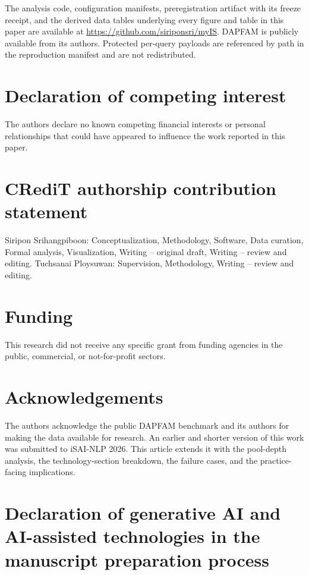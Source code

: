 \documentclass[preprint,11pt,authoryear]{elsarticle}          %
\begin{document}
The analysis code, configuration manifests, preregistration artifact with its freeze receipt, and the derived data tables underlying every figure and table in this paper are available at \url{https://github.com/siriponsri/myIS}. DAPFAM is publicly available from its authors. Protected per-query payloads are referenced by path in the reproduction manifest and are not redistributed.

\section*{Declaration of competing interest}

The authors declare no known competing financial interests or personal relationships that could have appeared to influence the work reported in this paper.

\section*{CRediT authorship contribution statement}

Siripon Srihangpiboon: Conceptualization, Methodology, Software, Data curation, Formal analysis, Visualization, Writing -- original draft, Writing -- review and editing. Tuchsanai Ploysuwan: Supervision, Methodology, Writing -- review and editing.

\section*{Funding}

This research did not receive any specific grant from funding agencies in the public, commercial, or not-for-profit sectors.

\section*{Acknowledgements}

The authors acknowledge the public DAPFAM benchmark and its authors for making the data available for research. An earlier and shorter version of this work was submitted to iSAI-NLP 2026. This
article extends it with the pool-depth analysis, the technology-section
breakdown, the failure cases, and the practice-facing implications.

\section*{Declaration of generative AI and AI-assisted technologies in the manuscript preparation process}
\end{document}
